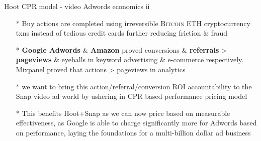 \documentclass[11pt]{beamer}
\begin{document}
\begin{frame}[t]{Hoot CPR model - video Adwords economics ii}
\begin{itemize}[<+-| alert@+>]

\item[*]Buy actions are completed using irreversible \textsc{Bitcoin ETH} cryptocurrency txns instead of tedious credit cards further reducing friction \& fraud
\item[*]\textbf{Google Adwords} \& \textbf{Amazon} proved conversions \& \textbf{referrals} > \textbf{pageviews} \& eyeballs in keyword advertising \& e-commerce respectively. Mixpanel proved that actions > pageviews in analytics
\item[*]we want to bring this action/referral/conversion ROI accountability to the Snap video ad world by ushering in CPR based performance pricing model
\item[*]This benefits Hoot+Snap as we can now price based on measurable effectiveness, as Google is able to charge significantly more for Adwords based on performance, laying the foundations for a multi-billion dollar ad business

\end{itemize}
\end{frame}
\end{document}

